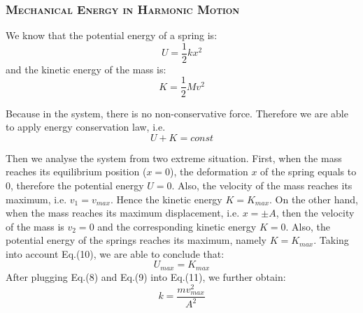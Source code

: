 \documentclass[a4paper,12pt]{article}
\begin{document}
\subsubsection{\textsc{Mechanical Energy in Harmonic Motion}}
We know that the potential energy of a spring is:
\begin{equation}
U = \frac{1}{2}kx^2
\end{equation}
and the kinetic energy of the mass is:
\begin{equation}
K = \frac{1}{2}Mv^2
\end{equation}
\par Because in the system, there is no non-conservative force. Therefore we are able to apply energy conservation law, i.e. 
\begin{equation}
U + K = const
\end{equation}
\par Then we analyse the system from two extreme situation. First, when the mass reaches its equilibrium position ($x = 0$), the deformation $x$ of the spring equals to $0$, therefore the potential energy $U = 0$. Also, the velocity of the mass reaches its maximum, i.e. $v_1 = v_{max}$. Hence the kinetic energy $K = K_{max}$. On the other hand, when the mass reaches its maximum displacement, i.e. $x = \pm A$, then the velocity of the mass is $v_2 = 0$ and the corresponding kinetic energy $K = 0$. Also, the potential energy of the springs reaches its maximum, namely $K = K_{max}$. Taking into account Eq.(10), we are able to conclude that:
\begin{equation}
U_{max} = K_{max}
\end{equation}
After plugging Eq.(8) and Eq.(9) into Eq.(11), we further obtain:
\begin{equation}
k = \frac{mv_{max}^2}{A^2}
\end{equation}

\end{document}

